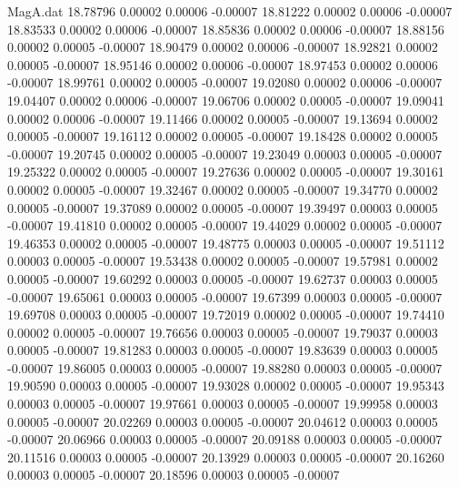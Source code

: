 \begin{filecontents}{MagA.dat}
  18.78796    0.00002    0.00006   -0.00007
  18.81222    0.00002    0.00006   -0.00007
  18.83533    0.00002    0.00006   -0.00007
  18.85836    0.00002    0.00006   -0.00007
  18.88156    0.00002    0.00005   -0.00007
  18.90479    0.00002    0.00006   -0.00007
  18.92821    0.00002    0.00005   -0.00007
  18.95146    0.00002    0.00006   -0.00007
  18.97453    0.00002    0.00006   -0.00007
  18.99761    0.00002    0.00005   -0.00007
  19.02080    0.00002    0.00006   -0.00007
  19.04407    0.00002    0.00006   -0.00007
  19.06706    0.00002    0.00005   -0.00007
  19.09041    0.00002    0.00006   -0.00007
  19.11466    0.00002    0.00005   -0.00007
  19.13694    0.00002    0.00005   -0.00007
  19.16112    0.00002    0.00005   -0.00007
  19.18428    0.00002    0.00005   -0.00007
  19.20745    0.00002    0.00005   -0.00007
  19.23049    0.00003    0.00005   -0.00007
  19.25322    0.00002    0.00005   -0.00007
  19.27636    0.00002    0.00005   -0.00007
  19.30161    0.00002    0.00005   -0.00007
  19.32467    0.00002    0.00005   -0.00007
  19.34770    0.00002    0.00005   -0.00007
  19.37089    0.00002    0.00005   -0.00007
  19.39497    0.00003    0.00005   -0.00007
  19.41810    0.00002    0.00005   -0.00007
  19.44029    0.00002    0.00005   -0.00007
  19.46353    0.00002    0.00005   -0.00007
  19.48775    0.00003    0.00005   -0.00007
  19.51112    0.00003    0.00005   -0.00007
  19.53438    0.00002    0.00005   -0.00007
  19.57981    0.00002    0.00005   -0.00007
  19.60292    0.00003    0.00005   -0.00007
  19.62737    0.00003    0.00005   -0.00007
  19.65061    0.00003    0.00005   -0.00007
  19.67399    0.00003    0.00005   -0.00007
  19.69708    0.00003    0.00005   -0.00007
  19.72019    0.00002    0.00005   -0.00007
  19.74410    0.00002    0.00005   -0.00007
  19.76656    0.00003    0.00005   -0.00007
  19.79037    0.00003    0.00005   -0.00007
  19.81283    0.00003    0.00005   -0.00007
  19.83639    0.00003    0.00005   -0.00007
  19.86005    0.00003    0.00005   -0.00007
  19.88280    0.00003    0.00005   -0.00007
  19.90590    0.00003    0.00005   -0.00007
  19.93028    0.00002    0.00005   -0.00007
  19.95343    0.00003    0.00005   -0.00007
  19.97661    0.00003    0.00005   -0.00007
  19.99958    0.00003    0.00005   -0.00007
  20.02269    0.00003    0.00005   -0.00007
  20.04612    0.00003    0.00005   -0.00007
  20.06966    0.00003    0.00005   -0.00007
  20.09188    0.00003    0.00005   -0.00007
  20.11516    0.00003    0.00005   -0.00007
  20.13929    0.00003    0.00005   -0.00007
  20.16260    0.00003    0.00005   -0.00007
  20.18596    0.00003    0.00005   -0.00007

\end{filecontents}
